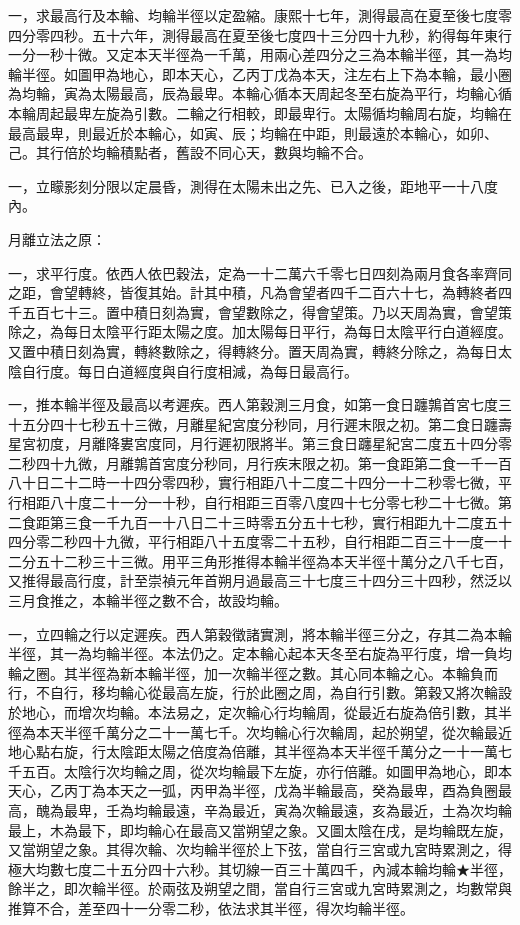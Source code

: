 \begin{pinyinscope}
一，求最高行及本輪、均輪半徑以定盈縮。康熙十七年，測得最高在夏至後七度零四分零四秒。五十六年，測得最高在夏至後七度四十三分四十九秒，約得每年東行一分一秒十微。又定本天半徑為一千萬，用兩心差四分之三為本輪半徑，其一為均輪半徑。如圖甲為地心，即本天心，乙丙丁戊為本天，注左右上下為本輪，最小圈為均輪，寅為太陽最高，辰為最卑。本輪心循本天周起冬至右旋為平行，均輪心循本輪周起最卑左旋為引數。二輪之行相較，即最卑行。太陽循均輪周右旋，均輪在最高最卑，則最近於本輪心，如寅、辰；均輪在中距，則最遠於本輪心，如卯、己。其行倍於均輪積點者，舊設不同心天，數與均輪不合。

一，立矇影刻分限以定晨昏，測得在太陽未出之先、已入之後，距地平一十八度內。

月離立法之原：

一，求平行度。依西人依巴穀法，定為一十二萬六千零七日四刻為兩月食各率齊同之距，會望轉終，皆復其始。計其中積，凡為會望者四千二百六十七，為轉終者四千五百七十三。置中積日刻為實，會望數除之，得會望策。乃以天周為實，會望策除之，為每日太陰平行距太陽之度。加太陽每日平行，為每日太陰平行白道經度。又置中積日刻為實，轉終數除之，得轉終分。置天周為實，轉終分除之，為每日太陰自行度。每日白道經度與自行度相減，為每日最高行。

一，推本輪半徑及最高以考遲疾。西人第穀測三月食，如第一食日躔鶉首宮七度三十五分四十七秒五十三微，月離星紀宮度分秒同，月行遲末限之初。第二食日躔壽星宮初度，月離降婁宮度同，月行遲初限將半。第三食日躔星紀宮二度五十四分零二秒四十九微，月離鶉首宮度分秒同，月行疾末限之初。第一食距第二食一千一百八十日二十二時一十四分零四秒，實行相距八十二度二十四分一十二秒零七微，平行相距八十度二十一分一十秒，自行相距三百零八度四十七分零七秒二十七微。第二食距第三食一千九百一十八日二十三時零五分五十七秒，實行相距九十二度五十四分零二秒四十九微，平行相距八十五度零二十五秒，自行相距二百三十一度一十二分五十二秒三十三微。用平三角形推得本輪半徑為本天半徑十萬分之八千七百，又推得最高行度，計至崇禎元年首朔月過最高三十七度三十四分三十四秒，然泛以三月食推之，本輪半徑之數不合，故設均輪。

一，立四輪之行以定遲疾。西人第穀徵諸實測，將本輪半徑三分之，存其二為本輪半徑，其一為均輪半徑。本法仍之。定本輪心起本天冬至右旋為平行度，增一負均輪之圈。其半徑為新本輪半徑，加一次輪半徑之數。其心同本輪之心。本輪負而行，不自行，移均輪心從最高左旋，行於此圈之周，為自行引數。第穀又將次輪設於地心，而增次均輪。本法易之，定次輪心行均輪周，從最近右旋為倍引數，其半徑為本天半徑千萬分之二十一萬七千。次均輪心行次輪周，起於朔望，從次輪最近地心點右旋，行太陰距太陽之倍度為倍離，其半徑為本天半徑千萬分之一十一萬七千五百。太陰行次均輪之周，從次均輪最下左旋，亦行倍離。如圖甲為地心，即本天心，乙丙丁為本天之一弧，丙甲為半徑，戊為半輪最高，癸為最卑，酉為負圈最高，醜為最卑，壬為均輪最遠，辛為最近，寅為次輪最遠，亥為最近，土為次均輪最上，木為最下，即均輪心在最高又當朔望之象。又圖太陰在戌，是均輪既左旋，又當朔望之象。其得次輪、次均輪半徑於上下弦，當自行三宮或九宮時累測之，得極大均數七度二十五分四十六秒。其切線一百三十萬四千，內減本輪均輪★半徑，餘半之，即次輪半徑。於兩弦及朔望之間，當自行三宮或九宮時累測之，均數常與推算不合，差至四十一分零二秒，依法求其半徑，得次均輪半徑。


\end{pinyinscope}
